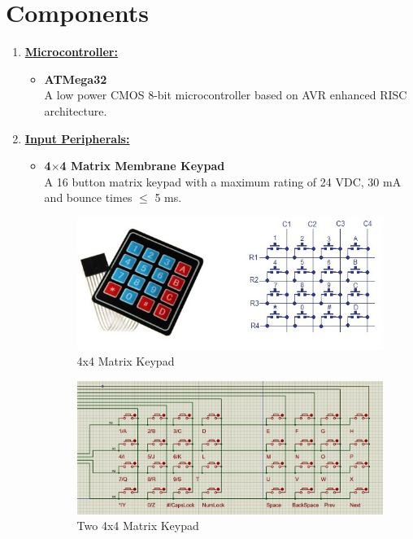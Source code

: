 \documentclass[a4paper,12pt]{article}
\begin{document}
	\section{Components}
	\begin{enumerate}
		\item \underline{\textbf{Microcontroller:}}
		\begin{itemize}
			\item \textbf{ATMega32} \\
			A low power CMOS 8-bit microcontroller based on AVR enhanced RISC architecture.
		\end{itemize}
		
		\item \underline{\textbf{Input Peripherals:}}
		\begin{itemize}
			\item \textbf{4$\times$4 Matrix Membrane Keypad} \\
			A 16 button matrix keypad with a maximum rating of 24 VDC, 30 mA and bounce times $\leq$ 5 ms.
			\begin{figure}[H]
				\centering
				\includegraphics[scale=0.7]{imgs/4x4-keypad.jpg}
				\caption{4x4 Matrix Keypad}
			\end{figure}
			\begin{figure}[H]
				\centering
		    	\includegraphics[scale=0.4]{imgs/4x4-keypad-x2.JPG}
				\caption{Two 4x4 Matrix Keypad}
			\end{figure}

\end{itemize}
\end{enumerate}
\end{document}
